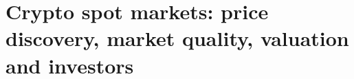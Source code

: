 \chapter{Crypto spot markets: price discovery, market quality, valuation and investors}\label{crypto-spot-markets}



